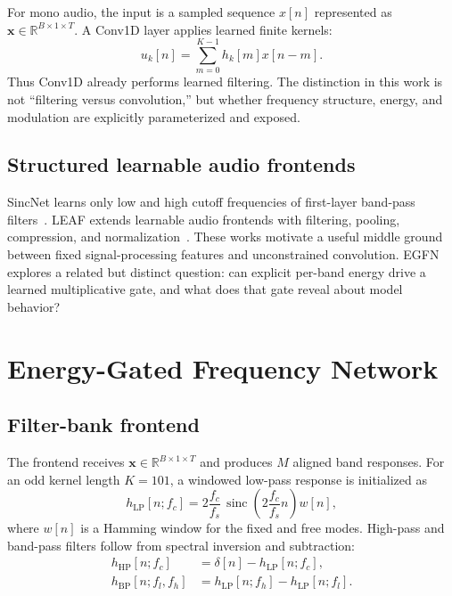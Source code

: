 \documentclass[10pt,twocolumn]{article}
\newcommand{\egfn}{EGFN}
\newcommand{\vect}[1]{\boldsymbol{#1}}
\begin{document}
For mono audio, the input is a sampled sequence
$x[n]$ represented as $\vect{x}\in\mathbb{R}^{B\times1\times T}$. A Conv1D
layer applies learned finite kernels:
\begin{equation}
  u_k[n]=\sum_{m=0}^{K-1}h_k[m]x[n-m].
  \label{eq:conv}
\end{equation}
Thus Conv1D already performs learned filtering. The distinction in this work is
not ``filtering versus convolution,'' but whether frequency structure, energy,
and modulation are explicitly parameterized and exposed.

\subsection{Structured learnable audio frontends}

SincNet learns only low and high cutoff frequencies of first-layer band-pass
filters~\cite{ravanelli2018sincnet}. LEAF extends learnable audio frontends with
filtering, pooling, compression, and normalization~\cite{zeghidour2021leaf}.
These works motivate a useful middle ground between fixed signal-processing
features and unconstrained convolution. \egfn{} explores a related but distinct
question: can explicit per-band energy drive a learned multiplicative gate, and
what does that gate reveal about model behavior?

\section{Energy-Gated Frequency Network}

\subsection{Filter-bank frontend}

The frontend receives $\vect{x}\in\mathbb{R}^{B\times1\times T}$ and produces
$M$ aligned band responses. For an odd kernel length $K=101$, a windowed
low-pass response is initialized as
\begin{equation}
  h_{\mathrm{LP}}[n;f_c]
  =2\frac{f_c}{f_s}\,
   \operatorname{sinc}\!\left(2\frac{f_c}{f_s}n\right)w[n],
  \label{eq:lowpass}
\end{equation}
where $w[n]$ is a Hamming window for the fixed and free modes. High-pass and
band-pass filters follow from spectral inversion and subtraction:
\begin{align}
  h_{\mathrm{HP}}[n;f_c] &= \delta[n]-h_{\mathrm{LP}}[n;f_c],\\
  h_{\mathrm{BP}}[n;f_l,f_h] &= h_{\mathrm{LP}}[n;f_h]-h_{\mathrm{LP}}[n;f_l].
\end{align}
\end{document}
